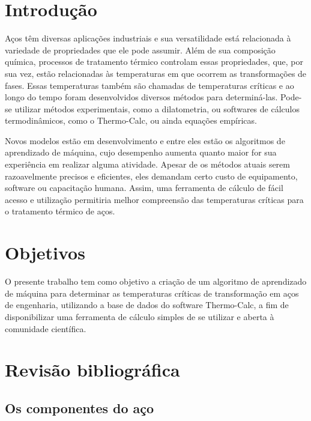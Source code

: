 \documentclass[brazil,tf,epusp]{usp}  %
\begin{document}
\elementospretextuais{}  %

\setlength\parindent{.85cm}  %

\chapter{Introdução}

Aços têm diversas aplicações industriais e sua versatilidade está relacionada à variedade de propriedades que ele pode assumir. Além de sua composição química, processos de tratamento térmico controlam essas propriedades, que, por sua vez, estão relacionadas às temperaturas em que ocorrem as transformações de fases. Essas temperaturas também são chamadas de temperaturas críticas e ao longo do tempo foram desenvolvidos diversos métodos para determiná-las. Pode-se utilizar métodos experimentais, como a dilatometria, ou softwares de cálculos termodinâmicos, como o Thermo-Calc\textregistered{}, ou ainda equações empíricas.

Novos modelos estão em desenvolvimento e entre eles estão os algoritmos de aprendizado de máquina, cujo desempenho aumenta quanto maior for sua experiência em realizar alguma atividade. Apesar de os métodos atuais serem razoavelmente precisos e eficientes, eles demandam certo custo de equipamento, software ou capacitação humana. Assim, uma ferramenta de cálculo de fácil acesso e utilização permitiria melhor compreensão das temperaturas críticas para o tratamento térmico de aços.

\chapter{Objetivos}

O presente trabalho tem como objetivo a criação de um algoritmo de aprendizado de máquina para determinar as temperaturas críticas de transformação em aços de engenharia, utilizando a base de dados do software Thermo-Calc\textregistered{}, a fim de disponibilizar uma ferramenta de cálculo simples de se utilizar e aberta à comunidade científica.

\chapter{Revisão bibliográfica}

\section{Os componentes do aço}
\end{document}
